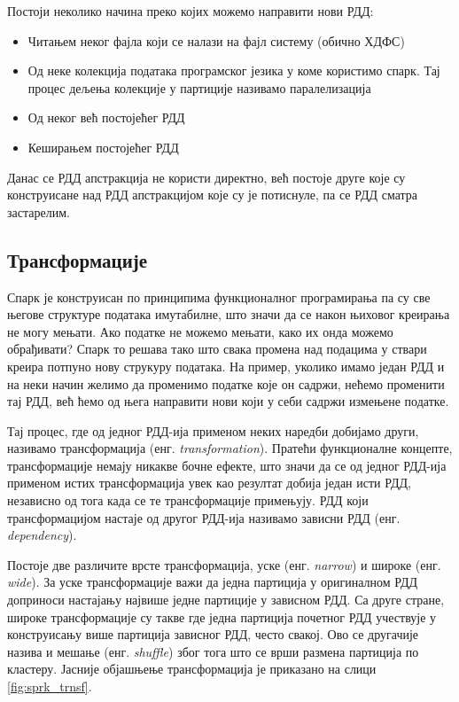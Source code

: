 \documentclass[12pt,oneside]{memoir}
\begin{document}
Постоји неколико начина преко којих можемо направити нови РДД:
\begin{itemize}
\item Читањем неког фајла који се налази на фајл систему (обично ХДФС)
\item Од неке колекција података програмског језика у коме користимо спарк. Тај процес дељења колекције у партиције називамо паралелизација
\item Од неког већ постојећег РДД
\item Кеширањем постојећег РДД
\end{itemize}

Данас се РДД апстракција не користи директно, већ постоје друге које су конструисане над РДД апстракцијом које су је потиснуле, па се РДД сматра застарелим.

\subsection{Трансформације}
\label{subsec:spark_transf}

Спарк је конструисан по принципима функционалног програмирања па су све његове структуре података имутабилне, што значи да се након њиховог креирања не могу мењати. Ако податке не можемо мењати, како их онда можемо обрађивати? Спарк то решава тако што свака промена над подацима у ствари креира потпуно нову струкуру података. На пример, уколико имамо један РДД и на неки начин желимо да променимо податке које он садржи, нећемо променити тај РДД, већ ћемо од њега направити нови који у себи садржи измењене податке. \cite{spark_guide}

Тај процес, где од једног РДД-ија применом неких наредби добијамо други, називамо трансформација (енг. \textit{transformation}). Пратећи функционалне концепте, трансформације немају никакве бочне ефекте, што значи да се од једног РДД-ија применом истих трансформација увек као резултат добија један исти РДД, независно од тога када се те трансформације примењују. РДД који трансформацијом настаје од другог РДД-ија називамо зависни РДД (енг. \textit{dependency}). \cite{spark_guide}

Постоје две различите врсте трансформација, уске (енг. \textit{narrow}) и широке (енг. \textit{wide}). За уске трансформације важи да једна партиција у оригиналном РДД доприноси настајању највише једне партиције у зависном РДД. Са друге стране, широке трансформације су такве где једна партиција почетног РДД учествује у конструисању више партиција зависног РДД, често свакој. Ово се другачије назива и мешање (енг. \textit{shuffle}) због тога што се врши размена партиција по кластеру. Јасније објашњење трансформација је приказано на слици \ref{fig:sprk_trnsf}. \cite{spark_guide}
\end{document}
